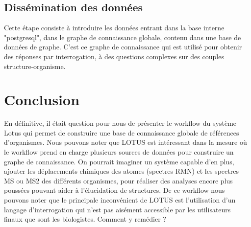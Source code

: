 \documentclass[12pt, french, latin.medieval, a4paper]{report}
\begin{document}
	\subsection{Dissémination des données}
	Cette étape consiste à introduire les données entrant dans la base interne "postgresql", dans le graphe de connaissance globale, contenu dans une base de données de graphe.
	C'est ce graphe de connaissance qui est utilisé pour obtenir des réponses par interrogation, à des questions complexes sur des couples structure-organisme.

	\section{Conclusion}
    En définitive, il était question pour nous de présenter le workflow du système Lotus qui permet de construire une base de connaissance globale de références d’organismes.  
    Nous pouvons noter que LOTUS est intéressant dans la mesure où le workflow prend en charge plusieurs sources de données pour construire un graphe de connaissance. On pourrait imaginer un système capable d’en plus, ajouter les déplacements chimiques des atomes (spectres RMN) et les spectres MS ou MS2 des différents organismes, pour réaliser des analyses encore plus poussées pouvant aider à l’élucidation de structures. De ce workflow nous pouvons noter que le principale inconvénient de LOTUS est l’utilisation d’un langage d'interrogation qui n’est pas aisément accessible par les utilisateurs finaux que sont les biologistes. Comment y remédier ?


    
\end{document}
